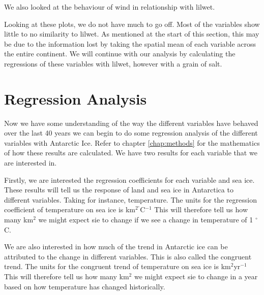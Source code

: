 \documentclass[../main.tex]{subfiles}
\begin{document}
We also looked at the behaviour of wind in relationship with \gls{lilwet}.

Looking at these plots, we do not have much to go off. Most of the variables show little to no similarity to \gls{lilwet}. As mentioned at the start of this section, this may be due to the information lost by taking the spatial mean of each variable across the entire continent. We will continue with our analysis by calculating the regressions of these variables with \gls{lilwet}, however with a grain of salt. 

\FloatBarrier

\section{Regression Analysis}

Now we have some understanding of the way the different variables have behaved over the last 40 years we can begin to do some regression analysis of the different variables with Antarctic Ice. Refer to chapter \ref{chap:methods} for the mathematics of how these results are calculated. We have two results for each variable that we are interested in. 

Firstly, we are interested the regression coefficients for each variable and sea ice. These results will tell us the response of land and sea ice in Antarctica to different variables. Taking for instance, temperature. The units for the regression coefficient of temperature on sea ice is km$^2^\circ$C$^{-1}$ This will therefore tell us how many km$^2$ we might expect \gls{sie} to change if we see a change in temperature of 1 $^\circ$C.

We are also interested in how much of the trend in Antarctic ice can be attributed to the change in different variables. This is also called the congruent trend. The units for the congruent trend of temperature on sea ice is km$^2$yr$^{-1}$ This will therefore tell us how many km$^2$ we might expect \gls{sie} to change in a year based on how temperature has changed historically.
\end{document}
